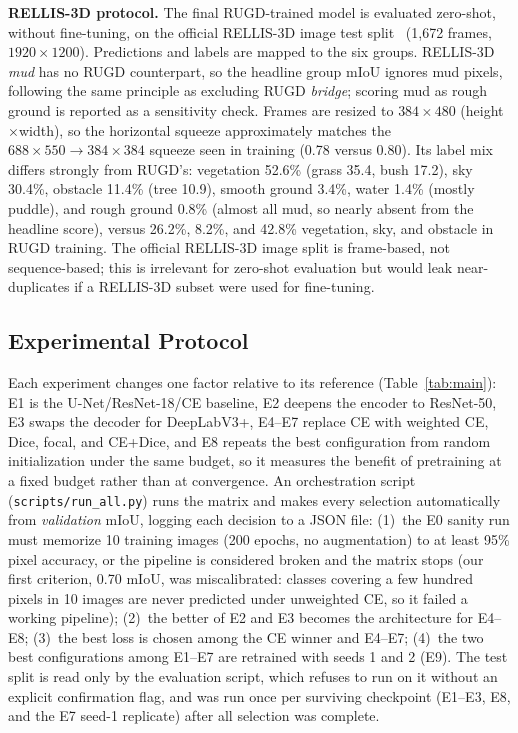 \textbf{RELLIS-3D protocol.} The final RUGD-trained model is evaluated
zero-shot, without fine-tuning, on the official RELLIS-3D image test
split~\cite{jiang2021rellis} (1,672 frames, $1920\times1200$). Predictions and
labels are mapped to the six groups. RELLIS-3D \emph{mud} has no RUGD
counterpart, so the headline group mIoU ignores mud pixels, following the same
principle as excluding RUGD \emph{bridge}; scoring mud as rough ground is
reported as a sensitivity check. Frames are resized to $384\times480$
(height$\times$width), so the horizontal squeeze approximately matches the
$688\times550\to384\times384$ squeeze seen in training (0.78 versus 0.80). Its label
mix differs strongly from RUGD's: vegetation 52.6\% (grass 35.4, bush 17.2),
sky 30.4\%, obstacle 11.4\% (tree 10.9), smooth ground 3.4\%, water 1.4\%
(mostly puddle), and rough ground 0.8\% (almost all mud, so nearly absent from
the headline score), versus 26.2\%, 8.2\%, and 42.8\% vegetation, sky, and
obstacle in RUGD training. The official RELLIS-3D image split is frame-based,
not sequence-based; this is irrelevant for zero-shot evaluation but would leak
near-duplicates if a RELLIS-3D subset were used for fine-tuning.

\subsection{Experimental Protocol}
\label{sec:protocol}

Each experiment changes one factor relative to its reference
(Table~\ref{tab:main}): E1 is the U-Net/ResNet-18/CE baseline, E2 deepens the
encoder to ResNet-50, E3 swaps the decoder for DeepLabV3+, E4--E7 replace CE
with weighted CE, Dice, focal, and CE+Dice, and E8 repeats the best
configuration from random initialization under the same budget, so it measures
the benefit of pretraining at a fixed budget rather than at convergence. An
orchestration script (\texttt{scripts/run\_all.py}) runs the matrix and makes
every selection automatically from \emph{validation} mIoU, logging each
decision to a JSON file: (1)~the E0 sanity run must memorize 10 training images
(200 epochs, no augmentation) to at least 95\% pixel accuracy, or the pipeline
is considered broken and the matrix stops (our first criterion, 0.70 mIoU, was
miscalibrated: classes covering a few hundred pixels in 10 images are never
predicted under unweighted CE, so it failed a working pipeline); (2)~the better of E2 and E3 becomes the architecture for E4--E8;
(3)~the best loss is chosen among the CE winner and E4--E7; (4)~the two best
configurations among E1--E7 are retrained with seeds 1 and 2 (E9). The test
split is read only by the evaluation script, which refuses to run on it without
an explicit confirmation flag, and was run once per surviving checkpoint
(E1--E3, E8, and the E7 seed-1 replicate) after all selection was complete.
